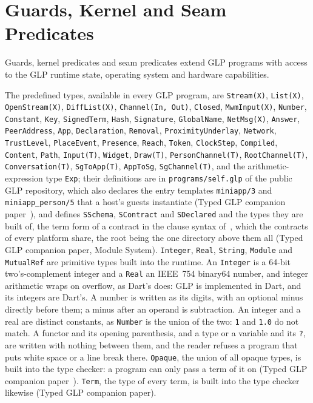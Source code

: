 \section{Guards, Kernel and Seam Predicates}\label{appendix:guards-system}

Guards, kernel predicates and seam predicates extend GLP programs with access to the GLP runtime state, operating system and hardware capabilities.

The predefined types, available in every GLP program, are \verb|Stream(X)|, \verb|List(X)|, \verb|OpenStream(X)|, \verb|DiffList(X)|, \verb|Channel(In, Out)|, \verb|Closed|, \verb|MwmInput(X)|, \verb|Number|, \verb|Constant|, \verb|Key|, \verb|SignedTerm|, \verb|Hash|, \verb|Signature|, \verb|GlobalName|, \verb|NetMsg(X)|, \verb|Answer|, \verb|PeerAddress|, \verb|App|, \verb|Declaration|, \verb|Removal|, \verb|ProximityUnderlay|, \verb|Network|, \verb|TrustLevel|, \verb|PlaceEvent|, \verb|Presence|, \verb|Reach|, \verb|Token|, \verb|ClockStep|, \verb|Compiled|, \verb|Content|, \verb|Path|, \verb|Input(T)|, \verb|Widget|, \verb|Draw(T)|, \verb|PersonChannel(T)|, \verb|RootChannel(T)|, \verb|Conversation(T)|, \verb|SgToApp(T)|, \verb|AppToSg|, \verb|SgChannel(T)|, and the arithmetic-expression type \verb|Exp|; their definitions are in \verb|programs/self.glp| of the public GLP repository, which also declares the entry templates \verb|miniapp/3| and \verb|miniapp_person/5| that a host's guests instantiate (Typed GLP companion paper~\cite{shapiro2026types}), and defines \verb|SSchema|, \verb|SContract| and \verb|SDeclared| and the types they are built of, the term form of a contract in the clause syntax of~\cite{shapiro2026formalising}, which the contracts of every platform share, the root being the one directory above them all (Typed GLP companion paper, Module System). \verb|Integer|, \verb|Real|, \verb|String|, \verb|Module| and \verb|MutualRef| are primitive types built into the runtime.  An \verb|Integer| is a 64-bit two's-complement integer and a \verb|Real| an IEEE~754 binary64 number, and integer arithmetic wraps on overflow, as Dart's does: GLP is implemented in Dart, and its integers are Dart's.  A number is written as its digits, with an optional minus directly before them; a minus after an operand is subtraction. An integer and a real are distinct constants, as \verb|Number| is the union of the two: \verb|1| and \verb|1.0| do not match.  A functor and its opening parenthesis, and a type or a variable and its \verb|?|, are written with nothing between them, and the reader refuses a program that puts white space or a line break there.  \verb|Opaque|, the union of all opaque types, is built into the type checker: a program can only pass a term of it on (Typed GLP companion paper~\cite{shapiro2026types}).  \verb|Term|, the type of every term, is built into the type checker likewise (Typed GLP companion paper).

